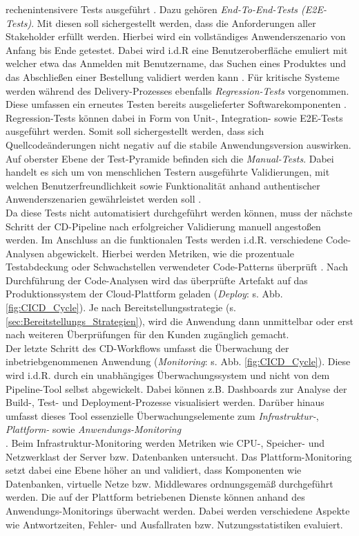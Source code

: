 rechenintensivere Tests ausgeführt \cite{Bose.20230220}. Dazu gehören \textit{End-To-End-Tests (\acs{E2E-Test}s)}. Mit diesen soll sichergestellt werden, dass die Anforderungen aller Stakeholder erfüllt werden. Hierbei wird ein vollständiges Anwenderszenario von Anfang bis Ende getestet. Dabei wird i.d.R eine Benutzeroberfläche emuliert mit welcher etwa das Anmelden mit Benutzername, das Suchen eines Produktes und das Abschließen einer Bestellung validiert werden kann \cite{Bose.20230220}. Für kritische Systeme werden während des Delivery-Prozesses ebenfalls \textit{Regression-Tests} vorgenommen. Diese umfassen ein erneutes Testen bereits ausgelieferter Softwarekomponenten \cite[S. 15 ff.]{Engstrom.2010}. Regression-Tests können dabei in Form von Unit-, Integration- sowie E2E-Tests ausgeführt werden. Somit soll sichergestellt werden, dass sich Quellcodeänderungen nicht negativ auf die stabile Anwendungsversion auswirken. Auf oberster Ebene der Test-Pyramide befinden sich die \textit{Manual-Tests}. Dabei handelt es sich um von menschlichen Testern ausgeführte Validierungen, mit welchen Benutzerfreundlichkeit sowie Funktionalität anhand authentischer Anwenderszenarien gewährleistet werden soll \cite{Guru99.2020}.\\ Da diese Tests nicht automatisiert durchgeführt werden können, muss der nächste Schritt der CD-Pipeline nach erfolgreicher Validierung manuell angestoßen werden. Im Anschluss an die funktionalen Tests werden i.d.R. verschiedene Code-Analysen abgewickelt. Hierbei werden Metriken, wie die prozentuale Testabdeckung oder Sch\-wachstellen verwendeter Code-Patterns überprüft \cite[146]{Rangnau.10520201082020}. Nach Durchführung der Code-Analysen wird das überprüfte Artefakt auf das Produktionssystem der Cloud-Plattform geladen (\textit{Deploy}: s. Abb. \ref{fig:CICD_Cycle}). Je nach Bereitstellungsstrategie (s. \ref{sec:Bereitstellungs_Strategien}), wird die Anwendung dann unmittelbar oder erst nach weiteren Überprüfungen für den Kunden zugänglich gemacht.\\ Der letzte Schritt des CD-Workflows umfasst die Überwachung der inbetriebgenommenen Anwendung (\textit{Monitoring}: s. Abb. \ref{fig:CICD_Cycle}). Diese wird i.d.R. durch ein unabhängiges Überwachungssystem und nicht von dem Pipeline-Tool selbst abgewickelt. Dabei können z.B. Dashboards zur Analyse der Build-, Test- und Deployment-Prozesse visualisiert werden. Darüber hinaus umfasst dieses Tool essenzielle Überwa\-chungselemente zum \textit{Infrastruktur-}, \textit{Plattform-} sowie \textit{Anwendungs-Monitoring} \cite{VMware.2022}\\ \cite{Datadog.2021}\cite{.2023}. Beim Infra\-struktur-Monitoring werden Metriken wie CPU-, Speicher- und Netzwerklast der Server bzw. Datenbanken untersucht. Das Plattform-Monitoring setzt dabei eine Ebene höher an und validiert, dass Komponenten wie Datenbanken, virtuelle Netze bzw. Middlewares ordnungsgemäß durchgeführt werden. Die auf der Plattform betriebenen Dienste können anhand des Anwendungs-Monitorings überwacht werden. Dabei werden verschiedene Aspekte wie Antwortzeiten, Fehler- und Ausfallraten bzw. Nutzungsstatistiken evaluiert.\\ 
